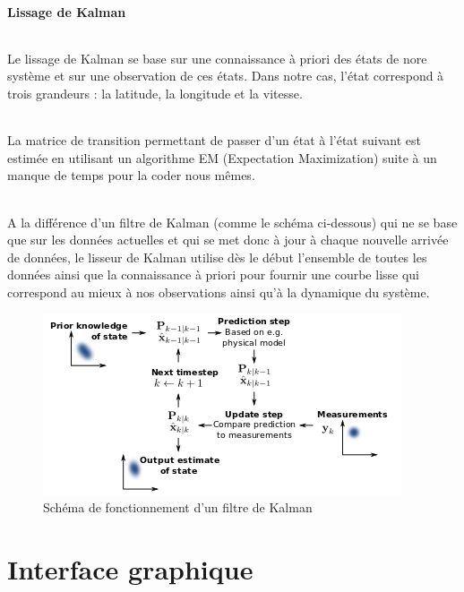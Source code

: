 \documentclass[11p, a4papert]{article}
\begin{document}
\newpage
\subsection{Lissage de Kalman}
\paragraph{}
Le lissage de Kalman se base sur une connaissance à priori des états de nore système et sur une observation de ces états. Dans notre cas, l'état correspond à trois grandeurs : la latitude, la longitude et la vitesse. 

\paragraph{}
La matrice de transition permettant de passer d'un état à l'état suivant est estimée en utilisant un algorithme EM (Expectation Maximization) suite à un manque de temps pour la coder nous mêmes. 
\paragraph{}
A la différence d'un filtre de Kalman (comme le schéma ci-dessous) qui ne se base que sur les données actuelles et qui se met donc à jour à chaque nouvelle arrivée de données, le lisseur de Kalman utilise dès le début l'ensemble de toutes les données ainsi que la connaissance à priori pour fournir une courbe lisse qui correspond au mieux à nos observations ainsi qu'à la dynamique du système.
\newline
\newline
\newline

\begin{figure}[h!]
\centering
\includegraphics[scale=0.8]{klman.png}
\caption{Schéma de fonctionnement d'un filtre de Kalman}
\end{figure}

\newpage
\part{Interface graphique}
\end{document}
